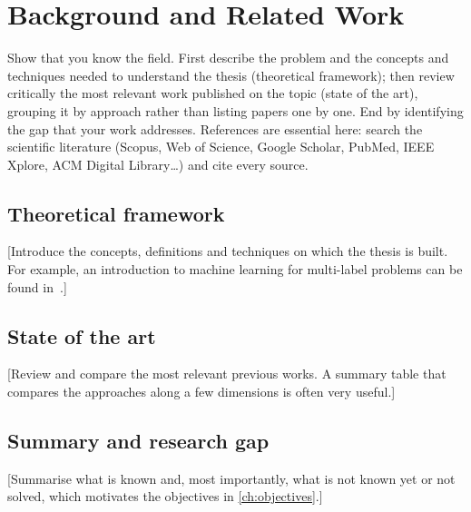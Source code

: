 \chapter{Background and Related Work}\label{ch:background}

\begin{guidance}
Show that you know the field. First describe the problem and the concepts and techniques
needed to understand the thesis (theoretical framework); then review critically the most
relevant work published on the topic (state of the art), grouping it by approach rather
than listing papers one by one. End by identifying the gap that your work addresses.
References are essential here: search the scientific literature (Scopus, Web of Science,
Google Scholar, PubMed, IEEE Xplore, ACM Digital Library\dots) and cite every source.
\end{guidance}

\section{Theoretical framework}\label{sec:framework}

[Introduce the concepts, definitions and techniques on which the thesis is built. For
example, an introduction to machine learning for multi-label problems can be found
in~\cite{herrera2016multilabel}.]

\section{State of the art}\label{sec:state-of-the-art}

[Review and compare the most relevant previous works. A summary table that compares the
approaches along a few dimensions is often very useful.]

\section{Summary and research gap}\label{sec:gap}

[Summarise what is known and, most importantly, what is not known yet or not solved,
which motivates the objectives in \autoref{ch:objectives}.]
